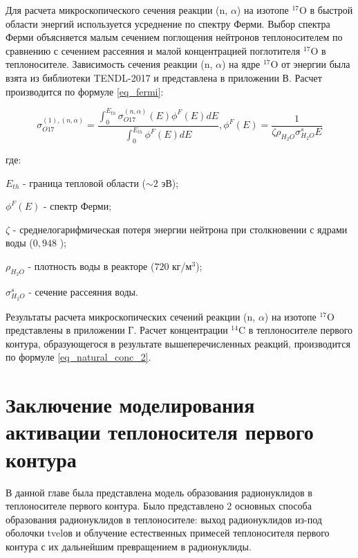 Для расчета микроскопического сечения реакции (n, $\alpha$) на изотопе $^{17}\text{O}$ в быстрой области энергий 
используется усреднение по спектру Ферми. Выбор спектра Ферми объясняется малым сечением поглощения нейтронов 
теплоносителем по сравнению с сечением рассеяния и малой концентрацией поглотителя $^{17}\text{O}$ в теплоносителе. 
Зависимость сечения реакции (n, $\alpha$) на ядре $^{17}\text{O}$ от энергии была взята из библиотеки TENDL-2017 
\cite{janis} и представлена в приложении В. Расчет производится по формуле \ref{eq_fermi}:

\begin{equation}
    \label{eq_fermi}
    \sigma_{O17}^{(1), (n, \alpha)} = \frac
        {\int_{0}^{E_{th}} \sigma_{O17}^{(n, \alpha)}(E) \phi^{F}(E) dE}
        {\int_{0}^{E_{th}} \phi^{F}(E) dE}, \phi^{F}(E) = \frac{1}{\zeta \rho_{H_2O} \sigma_{H_2O}^s E}
\end{equation}

где:
\begin{description}
    \item $E_{th}$ - граница тепловой области ($\sim 2$ эВ);
    \item $\phi^F(E)$ - спектр Ферми;
    \item $\zeta$ - среднелогарифмическая потеря энергии нейтрона при столкновении с ядрами воды ($0,948$ 
        \cite{savander_part1});
    \item $\rho_{H_2O}$ - плотность воды в реакторе ($720$ кг/м$^{3}$);
    \item $\sigma_{H_2O}^s$ - сечение рассеяния воды.
\end{description}

Результаты расчета микроскопических сечений реакции (n, $\alpha$) на изотопе $^{17}\text{O}$ представлены в приложении 
Г. Расчет концентрации $^{14}\text{C}$ в теплоносителе первого контура, образующегося в результате вышеперечисленных 
реакций, производится по формуле \ref{eq_natural_conc_2}.

\section{Заключение моделирования активации теплоносителя первого контура}

В данной главе была представлена модель образования радионуклидов в теплоносителе первого контура. Было представлено 2 
основных способа образования радионуклидов в теплоносителе: выход радионуклидов из-под оболочки \ac{tvel}ов и облучение 
естественных примесей теплоносителя первого контура с их дальнейшим превращением в радионуклиды.


